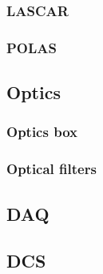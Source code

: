 \documentclass[UKenglish,texlive=2013]{\ATLASLATEXPATH atlasdoc}
\begin{document}
\subsubsection{LASCAR}



\subsubsection{POLAS}



\subsection{Optics}

\subsubsection{Optics box}



\subsubsection{Optical filters}




\subsection{DAQ}
\label{sec:daq}




\subsection{DCS}




\end{document}
